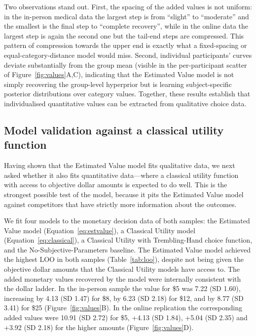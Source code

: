 \documentclass[11pt]{article}
\begin{document}
Two observations stand out. First, the spacing of the added values is not uniform: in the in-person medical data the largest step is from ``slight'' to ``moderate'' and the smallest is the final step to ``complete recovery'', while in the online data the largest step is again the second one but the tail-end steps are compressed. This pattern of compression towards the upper end is exactly what a fixed-spacing or equal-category-distance model would miss. Second, individual participants' curves deviate substantially from the group mean (visible in the per-participant scatter of Figure~\ref{fig:values}A,C), indicating that the Estimated Value model is not simply recovering the group-level hyperprior but is learning subject-specific posterior distributions over category values. Together, these results establish that individualised quantitative values can be extracted from qualitative choice data.

\subsection{Model validation against a classical utility function}

Having shown that the Estimated Value model fits qualitative data, we next asked whether it also fits quantitative data---where a classical utility function with access to objective dollar amounts is expected to do well. This is the strongest possible test of the model, because it pits the Estimated Value model against competitors that have strictly more information about the outcomes.

We fit four models to the monetary decision data of both samples: the Estimated Value model (Equation~\ref{eq:estvalue}), a Classical Utility model (Equation~\ref{eq:classical}), a Classical Utility with Trembling-Hand choice function, and the No-Subjective-Parameters baseline. The Estimated Value model achieved the highest LOO in both samples (Table~\ref{tab:loo}), despite not being given the objective dollar amounts that the Classical Utility models have access to. The added monetary values recovered by the model were internally consistent with the dollar ladder. In the in-person sample the value for \$5 was 7.22 (SD 1.60), increasing by 4.13 (SD 1.47) for \$8, by 6.23 (SD 2.18) for \$12, and by 8.77 (SD 3.41) for \$25 (Figure~\ref{fig:values}B). In the online replication the corresponding added values were 10.91 (SD 2.72) for \$5, +4.13 (SD 1.84), +5.04 (SD 2.35) and +3.92 (SD 2.18) for the higher amounts (Figure~\ref{fig:values}D).
\end{document}

